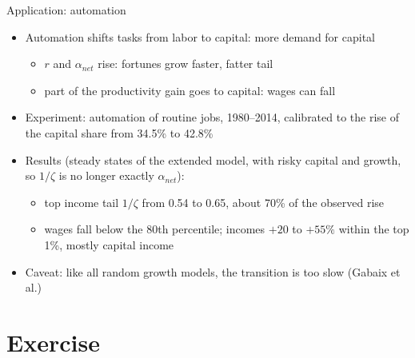 \documentclass[10pt,english,10pt,handout]{beamer}
\begin{document}
\begin{frame}{Application: automation}
\begin{itemize}
\item Automation shifts tasks from labor to capital: more demand for capital
\begin{itemize}
\item $r$ and $\alpha_{net}$ rise: fortunes grow faster, fatter tail
\item part of the productivity gain goes to capital: wages can fall
\end{itemize}
\item Experiment: automation of routine jobs, 1980--2014, calibrated to the rise of the capital share from 34.5\% to 42.8\%
\item Results (steady states of the extended model, with risky capital and growth, so $1/\zeta$ is no longer exactly $\alpha_{net}$):
\begin{itemize}
\item top income tail $1/\zeta$ from 0.54 to 0.65, about 70\% of the observed rise
\item wages fall below the 80th percentile; incomes $+20$ to $+55\%$ within the top 1\%, mostly capital income
\end{itemize}
\item Caveat: like all random growth models, the transition is too slow (Gabaix et al.)
\end{itemize}
\end{frame}

\section{Exercise}
\end{document}
